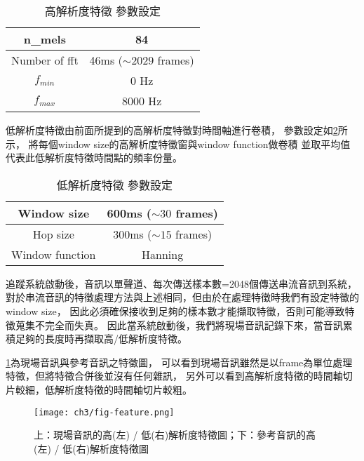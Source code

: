 \documentclass[class=NCU_thesis, crop=false]{standalone}
\begin{document}
\begin{table}[h]
    \centering
    \caption{高解析度特徵 參數設定}
    \label{table:table-high-resolution-feature-parameter-setting}
    \begin{tabular}{|c|c|}
        \hline
        \multicolumn{1}{|c|}{n\_mels} & \multicolumn{1}{|c|}{84}\\
        \hline
        Number of fft & 46ms ($\sim 2029$ frames)\\
        \hline
        $f_{min}$ & 0 Hz \\
        \hline
        $f_{max}$ & 8000 Hz \\
        \hline
    \end{tabular}
\end{table}

低解析度特徵由前面所提到的高解析度特徵對時間軸進行卷積，
參數設定如\cref{table:table-low-resolution-feature-parameter-setting}所示，
將每個window size的高解析度特徵窗與window function做卷積
並取平均值代表此低解析度特徵時間點的頻率份量。

\begin{table}[h]
    \centering
    \caption{低解析度特徵 參數設定}
    \label{table:table-low-resolution-feature-parameter-setting}
    \begin{tabular}{|c|c|}
        \hline
        \multicolumn{1}{|c|}{Window size} & \multicolumn{1}{|c|}{600ms ($\sim 30$ frames)}\\
        \hline
        Hop size & 300ms ($\sim 15$ frames)\\
        \hline
        Window function & Hanning \\
        \hline
    \end{tabular}
\end{table}

追蹤系統啟動後，音訊以單聲道、每次傳送樣本數=2048個傳送串流音訊到系統，
對於串流音訊的特徵處理方法與上述相同，但由於在處理特徵時我們有設定特徵的window size，
因此必須確保接收到足夠的樣本數才能擷取特徵，否則可能導致特徵蒐集不完全而失真。
因此當系統啟動後，我們將現場音訊記錄下來，當音訊累積足夠的長度時再擷取高/低解析度特徵。

\cref{fig:fig-ch3-feature}為現場音訊與參考音訊之特徵圖，
可以看到現場音訊雖然是以frame為單位處理特徵，但將特徵合併後並沒有任何雜訊，
另外可以看到高解析度特徵的時間軸切片較細，低解析度特徵的時間軸切片較粗。

\begin{figure}[!hbt]
    \centering
    \texttt{[image: ch3/fig-feature.png]}
    \caption{上：現場音訊的高(左) / 低(右)解析度特徵圖；下：參考音訊的高(左) / 低(右)解析度特徵圖}
    \label{fig:fig-ch3-feature}
\end{figure}
\end{document}
